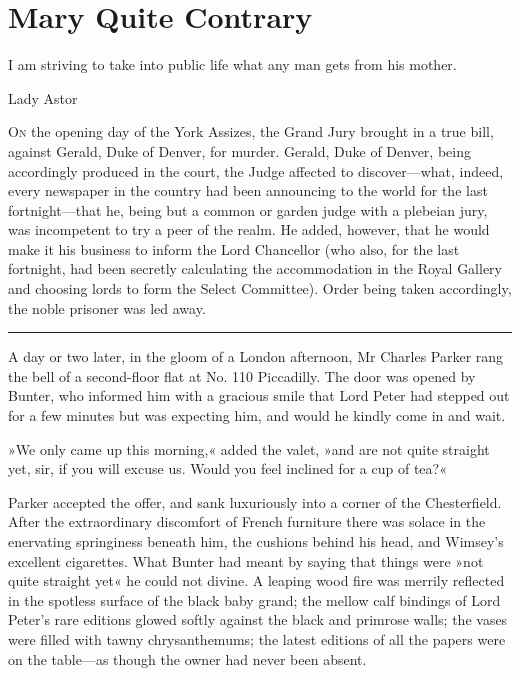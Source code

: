 \chapter{Mary Quite Contrary}

\epigraph{I am striving to take into public life what any man gets from his mother.}{Lady Astor}


\lettrine[lines=4]{O}{n} the opening day of the York Assizes, the Grand Jury brought in a true bill, against Gerald, Duke of Denver, for murder. Gerald, Duke of Denver, being accordingly produced in the court, the Judge affected to discover\allowbreak---\allowbreak what, indeed, every newspaper in the country had been announcing to the world for the last fortnight\allowbreak---\allowbreak that he, being but a common or garden judge with a plebeian jury, was incompetent to try a peer of the realm. He added, however, that he would make it his business to inform the Lord Chancellor (who also, for the last fortnight, had been secretly calculating the accommodation in the Royal Gallery and choosing lords to form the Select Committee). Order being taken accordingly, the noble prisoner was led away.

\noindent\hfil\rule{0.5\textwidth}{.4pt}\hfil

A day or two later, in the gloom of a London afternoon, Mr Charles Parker rang the bell of a second-floor flat at No. 110 Piccadilly. The door was opened by Bunter, who informed him with a gracious smile that Lord Peter had stepped out for a few minutes but was expecting him, and would he kindly come in and wait.

»We only came up this morning,« added the valet, »and are not quite straight yet, sir, if you will excuse us. Would you feel inclined for a cup of tea?«

Parker accepted the offer, and sank luxuriously into a corner of the Chesterfield. After the extraordinary discomfort of French furniture there was solace in the enervating springiness beneath him, the cushions behind his head, and Wimsey's excellent cigarettes. What Bunter had meant by saying that things were »not quite straight yet« he could not divine. A leaping wood fire was merrily reflected in the spotless surface of the black baby grand; the mellow calf bindings of Lord Peter's rare editions glowed softly against the black and primrose walls; the vases were filled with tawny chrysanthemums; the latest editions of all the papers were on the table\allowbreak---\allowbreak as though the owner had never been absent.

